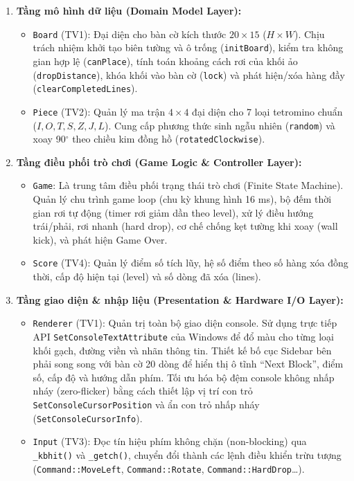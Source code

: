 \begin{enumerate}[leftmargin=1.8em]
  \item \textbf{Tầng mô hình dữ liệu (Domain Model Layer):}
  \begin{itemize}
    \item \texttt{Board} (TV1): Đại diện cho bàn cờ kích thước $20 \times 15$ ($H \times W$). Chịu trách nhiệm khởi tạo biên tường và ô trống (\texttt{initBoard}), kiểm tra không gian hợp lệ (\texttt{canPlace}), tính toán khoảng cách rơi của khối ảo (\texttt{dropDistance}), khóa khối vào bàn cờ (\texttt{lock}) và phát hiện/xóa hàng đầy (\texttt{clearCompletedLines}).
    \item \texttt{Piece} (TV2): Quản lý ma trận $4 \times 4$ đại diện cho 7 loại tetromino chuẩn ($I, O, T, S, Z, J, L$). Cung cấp phương thức sinh ngẫu nhiên (\texttt{random}) và xoay 90$^\circ$ theo chiều kim đồng hồ (\texttt{rotatedClockwise}).
  \end{itemize}

  \item \textbf{Tầng điều phối trò chơi (Game Logic \& Controller Layer):}
  \begin{itemize}
    \item \texttt{Game}: Là trung tâm điều phối trạng thái trò chơi (Finite State Machine). Quản lý chu trình game loop (chu kỳ khung hình 16 ms), bộ đếm thời gian rơi tự động (timer rơi giảm dần theo level), xử lý điều hướng trái/phải, rơi nhanh (hard drop), cơ chế chống kẹt tường khi xoay (wall kick), và phát hiện Game Over.
    \item \texttt{Score} (TV4): Quản lý điểm số tích lũy, hệ số điểm theo số hàng xóa đồng thời, cấp độ hiện tại (level) và số dòng đã xóa (lines).
  \end{itemize}

  \item \textbf{Tầng giao diện \& nhập liệu (Presentation \& Hardware I/O Layer):}
  \begin{itemize}
    \item \texttt{Renderer} (TV1): Quản trị toàn bộ giao diện console. Sử dụng trực tiếp API \texttt{SetConsoleTextAttribute} của Windows để đổ màu cho từng loại khối gạch, đường viền và nhãn thông tin. Thiết kế bố cục Sidebar bên phải song song với bàn cờ 20 dòng để hiển thị ô tĩnh ``Next Block'', điểm số, cấp độ và hướng dẫn phím. Tối ưu hóa bộ đệm console không nhấp nháy (zero-flicker) bằng cách thiết lập vị trí con trỏ \texttt{SetConsoleCursorPosition} và ẩn con trỏ nhấp nháy (\texttt{SetConsoleCursorInfo}).
    \item \texttt{Input} (TV3): Đọc tín hiệu phím không chặn (non-blocking) qua \texttt{\_kbhit()} và \texttt{\_getch()}, chuyển đổi thành các lệnh điều khiển trừu tượng (\texttt{Command::MoveLeft}, \texttt{Command::Rotate}, \texttt{Command::HardDrop}\ldots).
  \end{itemize}
\end{enumerate}

